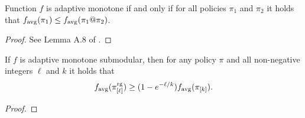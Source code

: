 \begin{lemma}
  Function $f$ is adaptive monotone if and only if for all policies $\pi_1$ and $\pi_2$ it holds that $f_{\mathrm{avg}}(\pi_1) \leq f_{\mathrm{avg}}(\pi_1 @ \pi_2)$.
\end{lemma}
\begin{proof}
See Lemma A.8 of \citet{golovin11}.
\end{proof}

\begin{theorem}
  If $f$ is adaptive monotone submodular, then for any policy $\pi$ and all non-negative integers $\ell$ and $k$ it holds that
  \begin{align*}
    f_{\mathrm{avg}}(\pi^{\textrm{rg}}_{[\ell]}) \geq (1 - e^{-\ell/k})f_{\mathrm{avg}}(\pi_{[k]}).
  \end{align*}
\end{theorem}
\begin{proof}
\todo{}
\end{proof}
